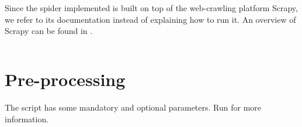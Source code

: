 Since the spider implemented is built on top of the web-crawling platform Scrapy, we refer to its documentation instead of explaining how to run it.
An overview of Scrapy can be found in \cite{kouzis2016learning}.

\inputminted{Python}{../code/random_spider.py}

\pagebreak
\section{Pre-processing} \label{preprocessing}
The script has some mandatory and optional parameters.
Run  for more information.

\inputminted{Python}{../code/preprocessing.py}